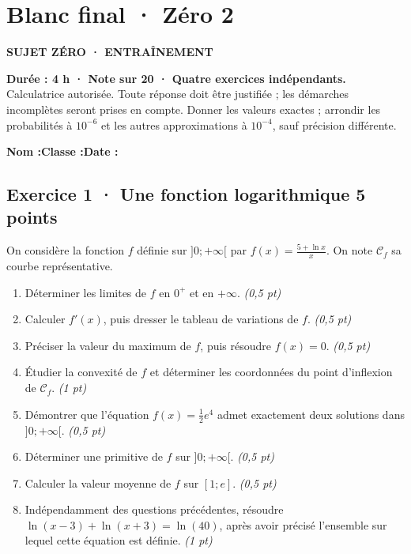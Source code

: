 \fi

\clearpage{}\label{sujet:9-2}

\section*{Blanc final · Zéro 2}

{\sffamily\bfseries\color{teal}SUJET ZÉRO · ENTRAÎNEMENT\par}

\textbf{Durée : 4 h · Note sur 20 · Quatre exercices indépendants.}\\Calculatrice autorisée. Toute réponse doit être justifiée ; les démarches incomplètes seront prises en compte. Donner les valeurs exactes ; arrondir les probabilités à $10^{-6}$ et les autres approximations à $10^{-4}$, sauf précision différente.

\smallskip\textbf{Nom :}\enspace\dotfill\quad\textbf{Classe :}\enspace\dotfill\quad\textbf{Date :}\enspace\dotfill

\subsection*{Exercice 1 · Une fonction logarithmique \hfill 5 points}On considère la fonction $f$ définie sur $]0;+\infty[$ par $f(x)=\frac{5+\ln x}x$. On note $\mathcal C_f$ sa courbe représentative.

\begin{enumerate}

\item Déterminer les limites de $f$ en $0^+$ et en $+\infty$. \hfill\textit{(0,5 pt)}

\item Calculer $f' (x)$, puis dresser le tableau de variations de $f$. \hfill\textit{(0,5 pt)}

\item Préciser la valeur du maximum de $f$, puis résoudre $f(x)=0$. \hfill\textit{(0,5 pt)}

\item Étudier la convexité de $f$ et déterminer les coordonnées du point d'inflexion de $\mathcal C_f$. \hfill\textit{(1 pt)}

\item Démontrer que l'équation $f(x)=\frac12 e^{4}$ admet exactement deux solutions dans $]0;+\infty[$. \hfill\textit{(0,5 pt)}

\item Déterminer une primitive de $f$ sur $]0;+\infty[$. \hfill\textit{(0,5 pt)}

\item Calculer la valeur moyenne de $f$ sur $[1;e]$. \hfill\textit{(0,5 pt)}

\item Indépendamment des questions précédentes, résoudre $\ln(x-3)+\ln(x+3)=\ln(40)$, après avoir précisé l'ensemble sur lequel cette équation est définie. \hfill\textit{(1 pt)}

\end{enumerate}

